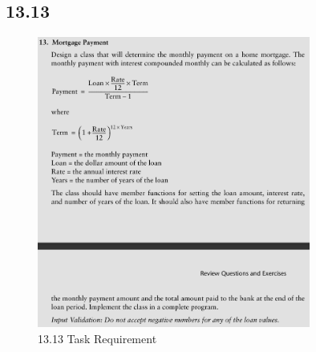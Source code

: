 \documentclass{article}
\begin{document}
\subsection*{13.13}
\begin{figure}[H]
    \centering
    \includegraphics[width=0.8\textwidth]{./Assets/Task requirements/Assignment10/13.13.png}
    \caption{13.13 Task Requirement}
\end{figure}
\end{document}
